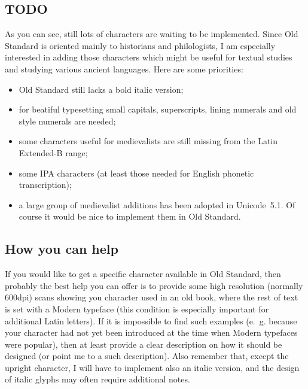 \documentclass[12pt,a4paper,openany]{book}
\begin{document}
\subsection{TODO}

As you can see, still lots of characters are waiting to be implemented.
Since Old Standard is oriented mainly to historians and philologists, I am
especially interested in adding those characters which might be useful for
textual studies and studying various ancient languages. Here are some
priorities:

\begin{itemize}

\item Old Standard still lacks a bold italic version;

\item for beatiful typesetting small capitals, superscripts, lining
numerals and old style numerals are needed;

\item some characters useful for medievalists are still missing from the
Latin Extended-B range;

\item some IPA characters (at least those needed for English phonetic
transcription);

\item a large group of medievalist additions has been adopted in Unicode~5.1.
Of course it would be nice to implement them in Old Standard.

\end{itemize}

\subsection{How you can help}

If you would like to get a specific character available in Old Standard,
then probably the best help you can offer is to provide some high
resolution (normally 600dpi) scans showing you character used in an old
book, where the rest of text is set with a Modern typeface (this condition
is especially important for additional Latin letters). If it is impossible
to find such examples (e.~g. because your character had not yet been
introduced at the time when Modern typefaces were popular), then at least 
provide a clear description on how it should be designed (or point me to a
such description). Also remember that, except the upright character, I will
have to implement also an italic version, and the design of italic glyphs
may often require additional notes.
\end{document}
